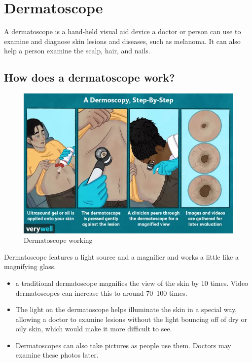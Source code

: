\documentclass{article}
\date{January 26,2022}
\begin{document}
\tableofcontents
\pagebreak
\section{Dermatoscope}

A dermatoscope is a hand-held visual aid device a doctor or person can use to examine and diagnose skin lesions and diseases, such as melanoma. It can also help a person examine the scalp, hair, and nails.

\subsection{How does a dermatoscope work?}
\begin{figure} [h]
     \centering
     \includegraphics[scale=0.5]{Dermatoscope working.jpg}
     \caption{Dermatoscope working}
     \label{fig:dermatoscope working}
 \end{figure}
Dermatoscope features a light source and a magnifier and works a little like a magnifying glass.
\begin{itemize}
\item a traditional dermatoscope magnifies the view of the skin by 10 times. Video dermatoscopes can increase this to around 70–100 times.
\item The light on the dermatoscope helps illuminate the skin in a special way, allowing a doctor to examine lesions without the light bouncing off of dry or oily skin, which would make it more difficult to see.
\item Dermatoscopes can also take pictures as people use them. Doctors may examine these photos later.
\end{itemize}
\end{document}
